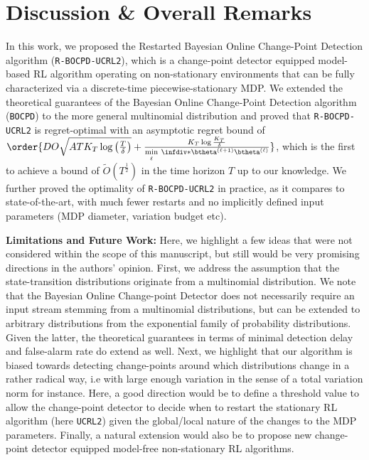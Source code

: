 \documentclass{article} %
\begin{document}
\section{Discussion \& Overall Remarks}
In this work, we proposed the Restarted Bayesian Online Change-Point Detection algorithm (\texttt{R-BOCPD-UCRL2}), which is a change-point detector equipped model-based RL algorithm operating on non-stationary environments that can be fully characterized via a discrete-time piecewise-stationary MDP. We extended the theoretical guarantees of the Bayesian Online Change-Point Detection algorithm (\texttt{BOCPD}) to the more general multinomial distribution and proved that \texttt{R-BOCPD-UCRL2} is regret-optimal with an asymptotic regret bound of $\order{D O \sqrt{A T K_T \log\left (\frac{T}{\delta} \right)} + \frac{K_T \log \frac{K_T}{\delta}}{\min\limits_\ell \: \infdiv*{\btheta^{(\ell+1)}}{\btheta^{(\ell)}}}}$, which is the first to achieve a bound of $\tilde{O}(T^{\frac{1}{2}})$ in the time horizon $T$ up to our knowledge. We further proved the optimality of \texttt{R-BOCPD-UCRL2} in practice, as it compares to state-of-the-art, with much fewer restarts and no implicitly defined input parameters (MDP diameter, variation budget etc). 


\textbf{Limitations and Future Work:} Here, we highlight a few ideas that were not considered within the scope of this manuscript, but still would be very promising directions in the authors' opinion. First, we address the assumption that the state-transition distributions originate from a multinomial distribution. We note that the Bayesian Online Change-point Detector does not necessarily require an input stream stemming from a multinomial distributions, but can be extended to arbitrary distributions from the exponential family of probability distributions. Given the latter, the theoretical guarantees in terms of minimal detection delay and false-alarm rate do extend as well. Next, we highlight that our algorithm is biased towards detecting change-points around which distributions change in a rather radical way, i.e with large enough variation in the sense of a total variation norm for instance. Here, a good direction would be to define a threshold value to allow the change-point detector to decide when to restart the stationary RL algorithm (here \texttt{UCRL2}) given the global/local nature of the changes to the MDP parameters. Finally, a natural extension would also be to propose new change-point detector equipped model-free non-stationary RL algorithms.    
\end{document}
